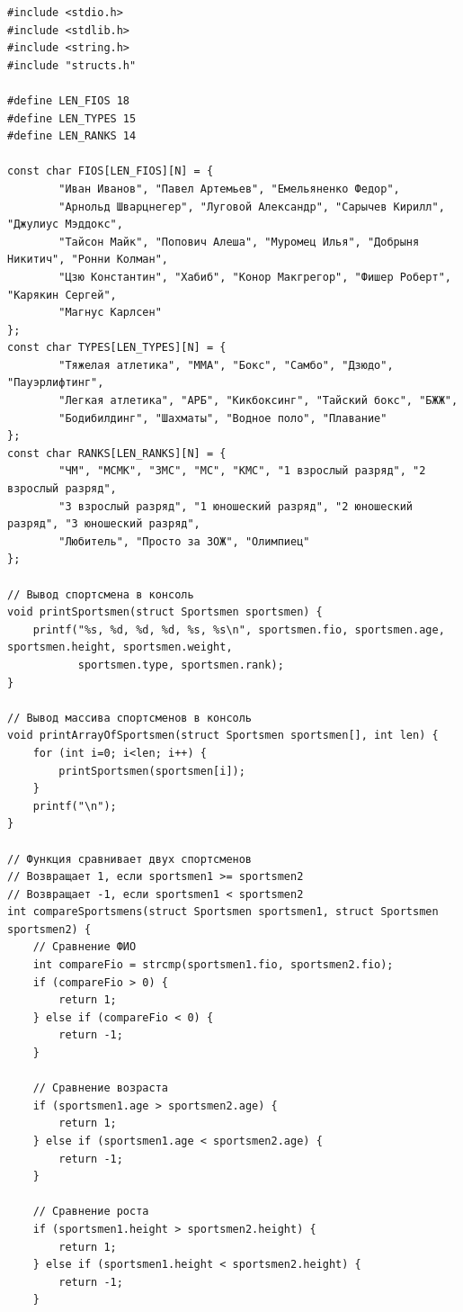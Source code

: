 \documentclass[12pt]{article}
\begin{document}
\begin{lstlisting}[label=repository.c, caption=repository.c]
#include <stdio.h>
#include <stdlib.h>
#include <string.h>
#include "structs.h"

#define LEN_FIOS 18
#define LEN_TYPES 15
#define LEN_RANKS 14

const char FIOS[LEN_FIOS][N] = {
        "Иван Иванов", "Павел Артемьев", "Емельяненко Федор",
        "Арнольд Шварцнегер", "Луговой Александр", "Сарычев Кирилл", "Джулиус Мэддокс",
        "Тайсон Майк", "Попович Алеша", "Муромец Илья", "Добрыня Никитич", "Ронни Колман",
        "Цзю Константин", "Хабиб", "Конор Макгрегор", "Фишер Роберт", "Карякин Сергей",
        "Магнус Карлсен"
};
const char TYPES[LEN_TYPES][N] = {
        "Тяжелая атлетика", "ММА", "Бокс", "Самбо", "Дзюдо", "Пауэрлифтинг",
        "Легкая атлетика", "АРБ", "Кикбоксинг", "Тайский бокс", "БЖЖ",
        "Бодибилдинг", "Шахматы", "Водное поло", "Плавание"
};
const char RANKS[LEN_RANKS][N] = {
        "ЧМ", "МСМК", "ЗМС", "МС", "КМС", "1 взрослый разряд", "2 взрослый разряд",
        "3 взрослый разряд", "1 юношеский разряд", "2 юношеский разряд", "3 юношеский разряд",
        "Любитель", "Просто за ЗОЖ", "Олимпиец"
};

// Вывод спортсмена в консоль
void printSportsmen(struct Sportsmen sportsmen) {
    printf("%s, %d, %d, %d, %s, %s\n", sportsmen.fio, sportsmen.age, sportsmen.height, sportsmen.weight,
           sportsmen.type, sportsmen.rank);
}

// Вывод массива спортсменов в консоль
void printArrayOfSportsmen(struct Sportsmen sportsmen[], int len) {
    for (int i=0; i<len; i++) {
        printSportsmen(sportsmen[i]);
    }
    printf("\n");
}

// Функция сравнивает двух спортсменов
// Возвращает 1, если sportsmen1 >= sportsmen2
// Возвращает -1, если sportsmen1 < sportsmen2
int compareSportsmens(struct Sportsmen sportsmen1, struct Sportsmen sportsmen2) {
    // Сравнение ФИО
    int compareFio = strcmp(sportsmen1.fio, sportsmen2.fio);
    if (compareFio > 0) {
        return 1;
    } else if (compareFio < 0) {
        return -1;
    }

    // Сравнение возраста
    if (sportsmen1.age > sportsmen2.age) {
        return 1;
    } else if (sportsmen1.age < sportsmen2.age) {
        return -1;
    }

    // Сравнение роста
    if (sportsmen1.height > sportsmen2.height) {
        return 1;
    } else if (sportsmen1.height < sportsmen2.height) {
        return -1;
    }


\end{lstlisting}
\end{document}
